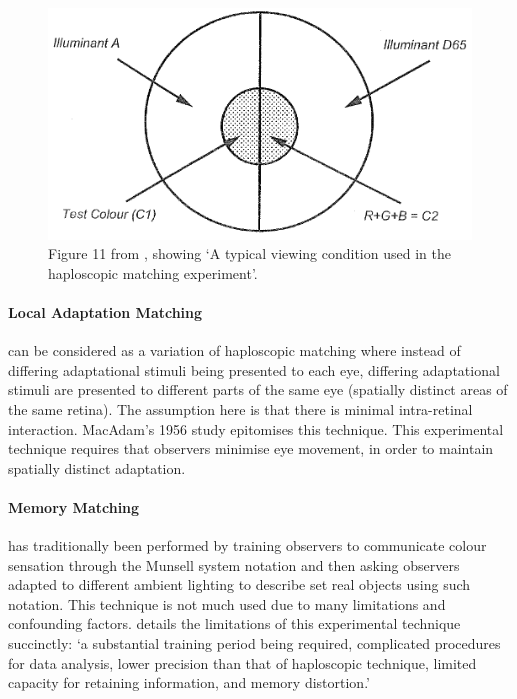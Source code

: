 \begin{figure}[htbp]
    \includegraphics[max width=\textwidth]{figs/LitRev/hapl.png}
    \caption{Figure 11 from \citet{cie_tc_1-52_cie_2004}, showing `A typical viewing condition used in the haploscopic matching experiment'.}
    \label{fig:hapl}
\end{figure} 


\paragraph{Local Adaptation Matching} can be considered as a variation of haploscopic matching where instead of differing adaptational stimuli being presented to each eye, differing adaptational stimuli are presented to different parts of the same eye (spatially distinct areas of the same retina). The assumption here is that there is minimal intra-retinal interaction. MacAdam's 1956 study \citep{macadam_chromatic_1956} epitomises this technique. This experimental technique requires that observers minimise eye movement, in order to maintain spatially distinct adaptation.

\paragraph{Memory Matching} has traditionally been performed by training observers to communicate colour sensation through the Munsell system notation \citep{helson_object-color_1952,lam_metamerism_1985} and then asking observers adapted to different ambient lighting to describe set real objects using such notation. This technique is not much used due to many limitations and confounding factors. \citet{luo_review_2000} details the limitations of this experimental technique succinctly: `a substantial training period being required, complicated procedures for data analysis, lower precision than that of haploscopic technique, limited capacity for retaining information, and memory distortion.'

